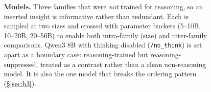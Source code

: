 \begin{figure}[t]
{}
\caption{\textbf{Models.} Three families that were \emph{not} trained for
reasoning, so an inserted insight is informative rather than redundant. Each is
sampled at two sizes and crossed with parameter buckets (5--10B, 10--20B,
20--50B) to enable both intra-family (size) and inter-family comparisons.
Qwen3 8B with thinking disabled (\texttt{/no\_think}) is set apart as a boundary
case: reasoning-trained but reasoning-suppressed, treated as a contrast rather
than a clean non-reasoning model. It is also the one model that breaks the
ordering pattern (\S\ref{sec:h3}).}
\label{fig:models}
\end{figure}
